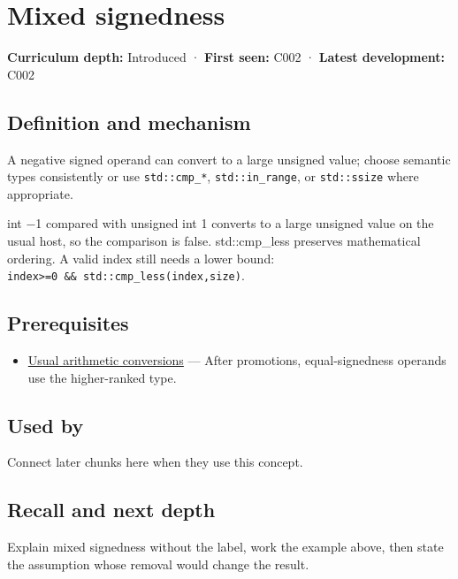 \hypertarget{appendix-736a2345de4a}{}
\section{Mixed signedness}\label{appendix-736a2345de4a-mixed-signedness}

\textbf{Curriculum depth:} Introduced · \textbf{First seen:} C002 · \textbf{Latest development:} C002

\subsection{Definition and mechanism}\label{appendix-736a2345de4a-definition-and-mechanism}

A negative signed operand can convert to a large unsigned value; choose semantic types consistently or use \texttt{std::cmp\_*}, \texttt{std::in\_range}, or \texttt{std::ssize} where appropriate.

int −1 compared with unsigned int 1 converts to a large unsigned value on the usual host, so the comparison is false. std::cmp\_less preserves mathematical ordering. A valid index still needs a lower bound: \texttt{index\textgreater{}=0\ \&\&\ std::cmp\_less(index,size)}.

\subsection{Prerequisites}\label{appendix-736a2345de4a-prerequisites}

\begin{itemize}
\tightlist
\item
  \hyperref[appendix-5e2d663adf7f]{Usual arithmetic conversions} --- After promotions, equal-signedness operands use the higher-ranked type.
\end{itemize}

\subsection{Used by}\label{appendix-736a2345de4a-used-by}

Connect later chunks here when they use this concept.

\subsection{Recall and next depth}\label{appendix-736a2345de4a-recall-and-next-depth}

Explain mixed signedness without the label, work the example above, then state the assumption whose removal would change the result.

